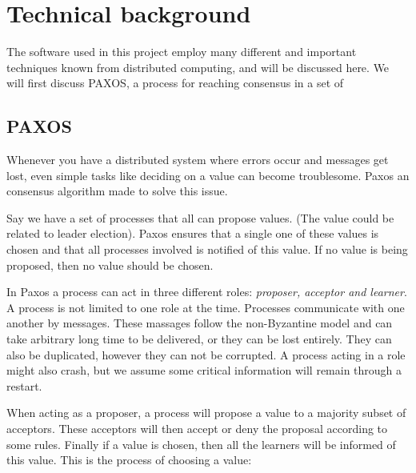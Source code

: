 
\section{Technical background}

The software used in this project employ many different and important techniques known from distributed computing, and will be discussed here.
We will first discuss PAXOS, a process for reaching consensus in a set of 

\subsection{PAXOS}
Whenever you have a distributed system where errors occur and messages get lost, even simple tasks like deciding on a value can become troublesome. Paxos an consensus algorithm made to solve this issue. 

Say we have a set of processes that all can propose values. (The value could be related to leader election). Paxos ensures that a single one of these values is chosen and that all processes involved is notified of this value. If no value is being proposed, then no value should be chosen. 

In Paxos a process can act in three different roles: {\it proposer, acceptor and learner}. A process is not limited to one role at the time. Processes communicate with one another by messages. These massages follow the non-Byzantine model and can take arbitrary long time to be delivered, or they can be lost entirely. They can also be duplicated, however they can not be corrupted. A process acting in a role might also crash, but we assume some critical information will remain through a restart. 

When acting as a proposer, a process will propose a value to a majority subset of acceptors. These acceptors will then accept or deny the proposal according to some rules. Finally if a value is chosen, then all the learners will be informed of this value. This is the process of choosing a value:

